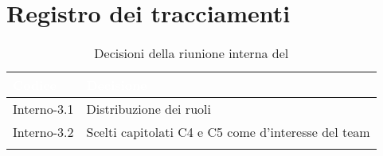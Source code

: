 \section{Registro dei tracciamenti}
{

\renewcommand{\arraystretch}{1.5}
\centering
\begin{longtable}{C{3cm} C{9cm}}
\textcolor{white}{\textbf{Codice}}&
\textcolor{white}{\textbf{Decisione}}\\	
\endhead
		
Interno-3.1 & Distribuzione dei ruoli\\

Interno-3.2 & Scelti capitolati C4 e C5 come  d'interesse del team\\
		
\caption{Decisioni della riunione interna del \Data{}}
\end{longtable}
}
